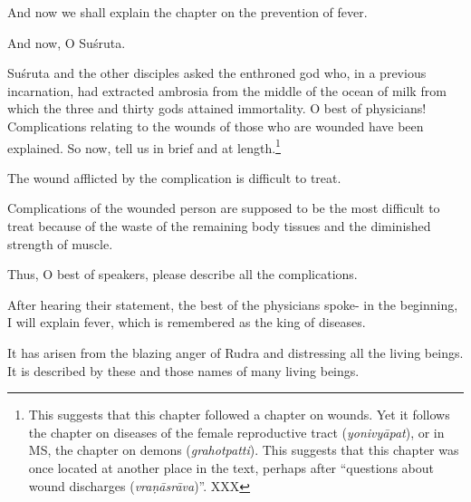 \begin{translation}
    
    
    \item[1]  And now we shall explain the chapter on the prevention of fever.
    
    
    \item[2]
    
    \item[3.1]  And now, O Suśruta.
    
    \item[3--5ab]  Suśruta and the other disciples asked the enthroned
god who, in a previous incarnation, had extracted ambrosia from the
middle of the ocean of milk from which the three and thirty gods
attained immortality. O best of physicians! Complications
relating to the wounds of those who are wounded have been explained.  So
now, tell us in brief and at length.\footnote{This
    suggests that this chapter followed a chapter on wounds.  Yet it
    follows the chapter on diseases of the female reproductive tract
    (\emph{yonivyāpat}), or in MS, the chapter on demons
    (\emph{grahotpatti}).  This suggests that this chapter was once
    located at another place in the text, perhaps after
     “questions about wound discharges
    (\emph{vraṇāsrāva})”. XXX}
    
    
    \item[5cd] The wound afflicted by the complication is difficult to treat.
    
    \item[6] Complications of the wounded person are supposed to be the most
    difficult to treat because of the waste of the remaining body tissues
    and the diminished strength of muscle.
    
    \item[7ab] Thus, O best of speakers, please describe all the complications.
    
    \item[8] After hearing their statement, the best of the physicians spoke- in
    the beginning, I will explain fever, which is remembered as the king of
    diseases.
    
    
    \item[9] It has arisen from the blazing anger of Rudra and distressing all the
    living beings. It is described by these and those names of many living
    beings.
    

\end{translation}
